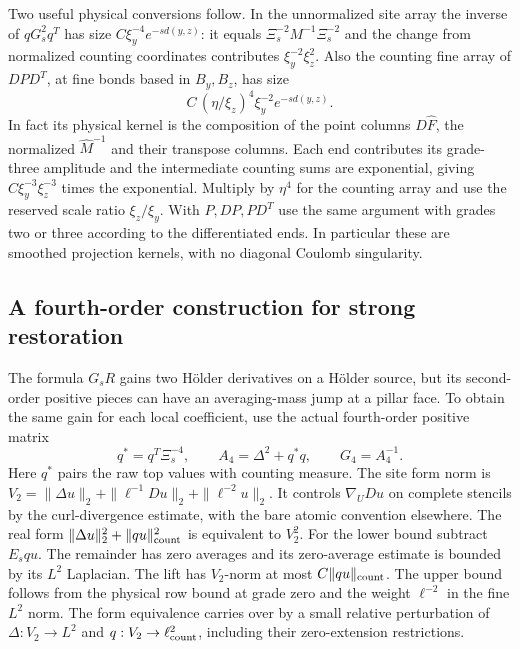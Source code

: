 \documentclass[11pt,letterpaper,reqno]{amsart}
\numberwithin{equation}{section}
\theoremstyle{definition}
\theoremstyle{remark}
\begin{document}
Two useful physical conversions follow. In the unnormalized site array the inverse of \(qG_s^2q^T\) has size \(C\xi_y^{-4}e^{-s d(y,z)}\): it equals \(\Xi_s^{-2}M^{-1}\Xi_s^{-2}\) and the change from normalized counting coordinates contributes \(\xi_y^{-2}\xi_z^2\). Also the counting fine array of \(D P D^T\), at fine bonds based in \(B_y,B_z\), has size
\begin{equation}\label{mb:eq-projection-point-kernel}
 C\,(\eta/\xi_z)^4\xi_y^{-2}e^{-s d(y,z)} .
\end{equation}
In fact its physical kernel is the composition of the point columns \(D\widehat F\), the normalized \(\widehat M^{-1}\) and their transpose columns. Each end contributes its grade-three amplitude and the intermediate counting sums are exponential, giving \(C\xi_y^{-3}\xi_z^{-3}\) times the exponential. Multiply by \(\eta^4\) for the counting array and use the reserved scale ratio \(\xi_z/\xi_y\). With \(P,DP,PD^T\) use the same argument with grades two or three according to the differentiated ends. In particular these are smoothed projection kernels, with no diagonal Coulomb singularity.

\subsection{A fourth-order construction for strong restoration}

The formula \(G_sR\) gains two H\"older derivatives on a H\"older source, but its second-order positive pieces can have an averaging-mass jump at a pillar face. To obtain the same gain for each local coefficient, use the actual fourth-order positive matrix
\[
  q^*=q^T\Xi_s^{-4},\qquad
  A_4=\Delta^2+q^*q,\qquad G_4=A_4^{-1}.
\]
Here \(q^*\) pairs the raw top values with counting measure. The site form norm is \(V_2=\|\Delta u\|_2+\|\ell^{-1}Du\|_2+\|\ell^{-2}u\|_2\). It controls \(\nabla_U Du\) on complete stencils by the curl-divergence estimate, with the bare atomic convention elsewhere. The real form \(\|\Delta u\|_2^2+\|qu\|_{\rm count}^2\) is equivalent to \(V_2^2\). For the lower bound subtract \(E_s qu\). The remainder has zero averages and its zero-average estimate is bounded by its \(L^2\) Laplacian. The lift has \(V_2\)-norm at most \(C\|qu\|_{\rm count}\). The upper bound follows from the physical row bound at grade zero and the weight \(\ell^{-2}\) in the fine \(L^2\) norm. The form equivalence carries over by a small relative perturbation of \(\Delta:V_2\to L^2\) and \(q:V_2\to\ell^2_{\rm count}\), including their zero-extension restrictions.
\end{document}
